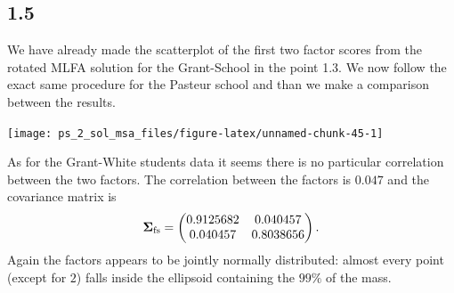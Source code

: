 \documentclass[
]{article}
\newenvironment{Shaded}{\begin{snugshade}}{\end{snugshade}}
\newcommand{\AttributeTok}[1]{\textcolor[rgb]{0.13,0.29,0.53}{#1}}
\newcommand{\DecValTok}[1]{\textcolor[rgb]{0.00,0.00,0.81}{#1}}
\newcommand{\FunctionTok}[1]{\textcolor[rgb]{0.13,0.29,0.53}{\textbf{#1}}}
\newcommand{\NormalTok}[1]{#1}
\newcommand{\OtherTok}[1]{\textcolor[rgb]{0.56,0.35,0.01}{#1}}
\newcommand{\SpecialCharTok}[1]{\textcolor[rgb]{0.81,0.36,0.00}{\textbf{#1}}}
\newcommand{\StringTok}[1]{\textcolor[rgb]{0.31,0.60,0.02}{#1}}
\theoremstyle{plain}
\begin{document}
\hypertarget{section-4}{%
\subsection{1.5}\label{section-4}}

We have already made the scatterplot of the first two factor scores from
the rotated MLFA solution for the Grant-School in the point 1.3. We now
follow the exact same procedure for the Pasteur school and than we make
a comparison between the results.

\smallskip

\begin{Shaded}
\end{Shaded}

\vspace{-40pt}

\begin{center}\texttt{[image: ps\_2\_sol\_msa\_files/figure-latex/unnamed-chunk-45-1]} \end{center}

As for the Grant-White students data it seems there is no particular
correlation between the two factors. The correlation between the factors
is \(0.047\) and the covariance matrix is \begin{equation*}
    \boldsymbol{\Sigma}_{\rm{fs}} = \begin{pmatrix}
        0.9125682 & 0.040457 \\
        0.040457 & 0.8038656
    \end{pmatrix}.
\end{equation*} Again the factors appears to be jointly normally
distributed: almost every point (except for \(2\)) falls inside the
ellipsoid containing the \(99\%\) of the mass.
\end{document}
